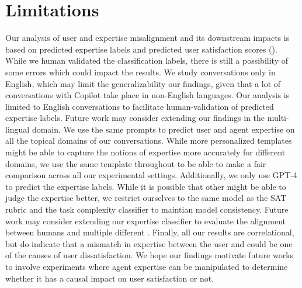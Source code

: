 \section{Limitations}
Our analysis of user and  expertise misalignment and its downstream impacts is based on predicted expertise labels and predicted user satisfaction scores (). While we human validated the classification labels, there is still a possibility of some errors which could impact the results. 
We study conversations only in English, which may limit the generalizability our findings, given that a lot of conversations with Copilot take place in non-English languages. Our analysis is limited to English conversations to facilitate human-validation of predicted expertise labels. Future work may consider extending our findings in the multi-lingual domain.
We use the same prompts to predict user and agent expertise on all the topical domains of our conversations. While more personalized templates might be able to capture the notions of expertise more accurately for different domains, we use the same template throughout to be able to make a fair comparison across all our experimental settings. 
Additionally, we only use GPT-4 to predict the expertise labels. While it is possible that other  might be able to judge the expertise better, we restrict ourselves to the same model as the SAT rubric and the task complexity classifier to maintian model consistency. Future work may consider extending our expertise classifier to evaluate the alignment between humans and multiple different .
Finally, all our results are correlational, but do indicate that a mismatch in expertise between the user and  could be one of the causes of user dissatisfaction. We hope our findings motivate future works to involve experiments where agent expertise can be manipulated to determine whether it has a causal impact on user satisfaction or not.